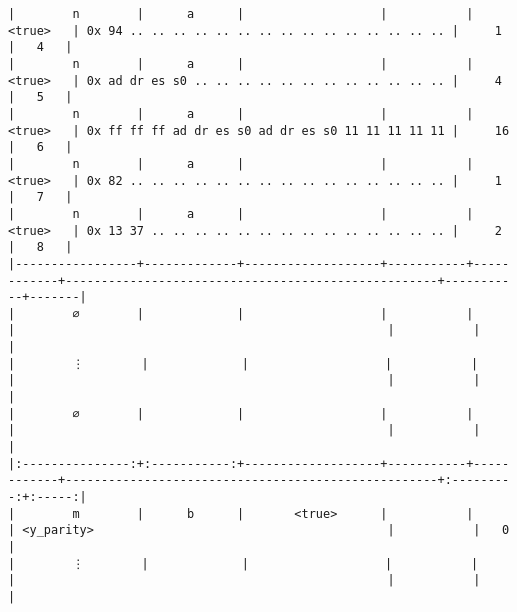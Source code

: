 \documentclass[varwidth=\maxdimen,margin=0.5cm,multi={verbatim}]{standalone}
\begin{document}
\begin{verbatim}
|        n        |      a      |                   |           |   <true>   | 0x 94 .. .. .. .. .. .. .. .. .. .. .. .. .. .. .. |     1     |   4   |
|        n        |      a      |                   |           |   <true>   | 0x ad dr es s0 .. .. .. .. .. .. .. .. .. .. .. .. |     4     |   5   |
|        n        |      a      |                   |           |   <true>   | 0x ff ff ff ad dr es s0 ad dr es s0 11 11 11 11 11 |     16    |   6   |
|        n        |      a      |                   |           |   <true>   | 0x 82 .. .. .. .. .. .. .. .. .. .. .. .. .. .. .. |     1     |   7   |
|        n        |      a      |                   |           |   <true>   | 0x 13 37 .. .. .. .. .. .. .. .. .. .. .. .. .. .. |     2     |   8   |
|-----------------+-------------+-------------------+-----------+------------+----------------------------------------------------+-----------+-------|
|        ∅        |             |                   |           |            |                                                    |           |       |
|        ⋮        |             |                   |           |            |                                                    |           |       |
|        ∅        |             |                   |           |            |                                                    |           |       |
|:---------------:+:-----------:+-------------------+-----------+------------+----------------------------------------------------+:---------:+:-----:|
|        m        |      b      |       <true>      |           |            | <y_parity>                                         |           |   0   |
|        ⋮        |             |                   |           |            |                                                    |           |       |

\end{verbatim}
\end{document}
